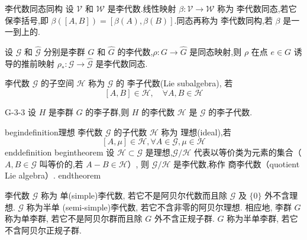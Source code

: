 \documentclass[../main.tex]{subfiles}
\begin{document}
\begin{definition}{}{李代数同态同构}
    设 $\mathscr{V}$ 和 $\mathscr{W}$ 是李代数.线性映射 $\beta : \mathscr{V}\rightarrow\mathscr{W}$ 称为 李代数同态,若它保李括号,即 $\beta([A,B]) = [\beta(A),\beta(B)]$.同态再称为 李代数同构,若 $\beta$ 是一一到上的.
\end{definition}
\begin{theorem}
    设 $\mathscr{G}$ 和 $\hat{\mathscr{G}}$ 分别是李群 $G$ 和 $\hat{G}$ 的李代数,$\rho:G\rightarrow\hat{G}$ 是同态映射,则 $\rho$ 在点 $e\in G$ 诱导的推前映射 $\rho_*:\mathscr{G}\rightarrow\hat{\mathscr{G}}$ 是李代数同态.
\end{theorem}
\begin{definition}
    李代数 $\mathscr{G}$ 的子空间 $\mathscr{H}$ 称为 $\mathscr{G}$ 的  李子代数(Lie subalgebra), 若
    $$ [A, B]\in\mathscr{H},\quad \forall A, B \in \mathscr{H} $$
\end{definition}
\begin{theorem}{}{G-3-3}
    设 $H$ 是李群 $G$ 的李子群,则 $H$ 的李代数 $\mathscr{H}$ 是 $\mathscr{G}$ 的李子代数.
\end{theorem}
begin{definition}{}{理想}	李代数 $\mathscr{G}$ 的子代数 $\mathscr{H}$ 称为 理想(ideal),若	$$ [A,\mu] \in \mathscr{H},\forall  A\in\mathscr{G},\mu \in \mathscr{H} $$
end{definition}
begin{theorem}{}	设 $\mathscr{H}\subset\mathscr{G}$ 是理想,$\mathscr{G}/\mathscr{H}$ 代表以等价类为元素的集合（$A,B\in \mathscr{G}$ 叫等价的,若 $A-B\in\mathscr{H}$）, 则 $\mathscr{G}/\mathscr{H}$ 是李代数,称作 商李代数（quotient Lie algebra）.
end{theorem}
\begin{definition}
    李代数 $  \mathscr{G}  $ 称为 单(simple)李代数, 若它不是阿贝尔代数而且除 $\mathscr{G}  $ 及 $  \{0\}$ 外不含理想. $ \mathscr{G}$ 称为半单 (semi-simple)李代数, 若它不含非零的阿贝尔理想. 相应地, 李群 $  G  $ 称为单李群, 若它不是阿贝尔群而且除 $  G  $ 外不含正规子群. $ G  $ 称为半单李群, 若它不含阿贝尔正规子群.
\end{definition}
\end{document}
